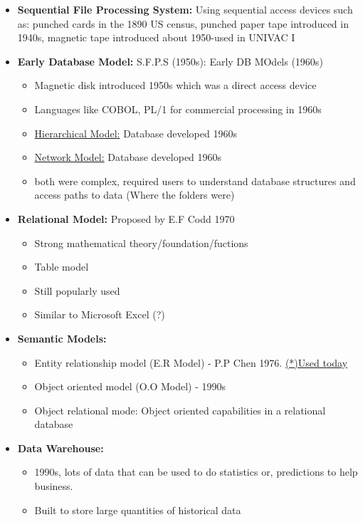 \documentclass[12pt]{article}
\begin{document}
\begin{itemize}
		  \item \textbf{Sequential File Processing System:} Using sequential access devices such as: punched cards in the 1890 US census, punched paper tape introduced in 1940s, magnetic tape introduced about 1950-used in UNIVAC I
		  \item \textbf{Early Database Model:} S.F.P.S (1950s): Early DB MOdels (1960s)
					 \begin{itemize}
								\item Magnetic disk introduced 1950s which was a direct access device
								\item Languages like COBOL, PL/1 for commercial processing in 1960s
								\item \underline{Hierarchical Model:} Database developed 1960s 
								\item \underline{Network Model:} Database developed 1960s
								\item both were complex, required users to understand database structures and 
										  access paths to data (Where the folders were)
					 \end{itemize}
		  \item \textbf{Relational Model:} Proposed by E.F Codd 1970 
					 \begin{itemize}
								\item Strong mathematical theory/foundation/fuctions
								\item Table model
								\item Still popularly used
								\item Similar to Microsoft Excel (?)
					 \end{itemize}
		  \item \textbf{Semantic Models:}
					 \begin{itemize}
								\item Entity relationship model (E.R Model) - P.P Chen 1976. \underline{(*)Used today}
								\item Object oriented model (O.O Model) - 1990s 
								\item Object relational mode: Object oriented capabilities in a relational database
					 \end{itemize}
		  \item \textbf{Data Warehouse:}
					 \begin{itemize}
								\item 1990s, lots of data that can be used to do statistics or, predictions to help business. 
								\item Built to store large quantities of historical data

\end{itemize}
\end{itemize}
\end{document}
